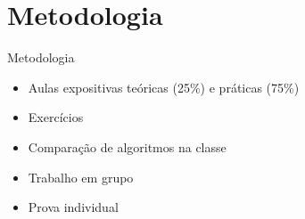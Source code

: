 \section*{Metodologia}

\begin{frame}
\begin{block}{Metodologia}
	 \begin{itemize}
			  \item Aulas expositivas teóricas (25\%) e práticas (75\%)
			  \item Exercícios
			  \item Comparação de algoritmos na classe
			  \item Trabalho em grupo
			  \item Prova individual
	 \end{itemize}
\end{block}
\end{frame}
